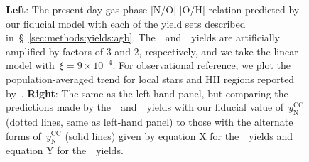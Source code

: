 \documentclass[ms.tex]{subfiles}
\begin{document}
\begin{figure}
\caption{
\textbf{Left}: The present day gas-phase [N/O]-[O/H] relation predicted by our 
fiducial model with each of the yield sets described 
in~\S~\ref{sec:methods:yields:agb}. 
The~\cristallo~and~\ventura~yields are artificially amplified by factors of 
3 and 2, respectively, and we take the linear model with~$\xi = 9\times10^{-4}$. 
For observational reference, we plot the population-averaged trend for local 
stars and HII regions reported by~\citet{Dopita2016}. 
\textbf{Right}: The same as the left-hand panel, but comparing the predictions 
made by the~\karakasten~and~\karakas~yields with our fiducial value 
of~$y_\text{N}^\text{CC}$ (dotted lines, same as left-hand panel) to those with 
the alternate forms of~$y_\text{N}^\text{CC}$ (solid lines) given by equation X 
for the~\karakasten~yields and equation Y for the~\karakas~yields. 
} 
\label{fig:no_oh_predictions} 
\end{figure} 
\end{document}
